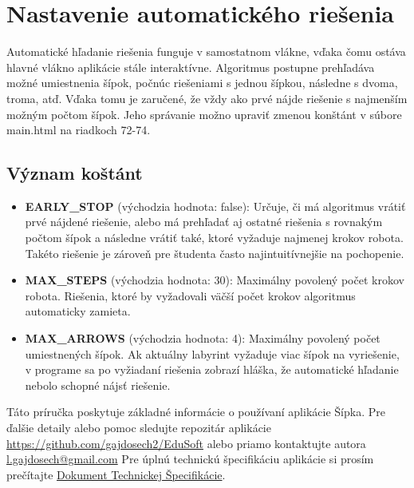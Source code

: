 \documentclass{article}
\begin{document}
\section*{Nastavenie automatického riešenia}

Automatické hľadanie riešenia funguje v samostatnom vlákne, vďaka čomu ostáva hlavné vlákno aplikácie stále interaktívne. 
Algoritmus postupne prehľadáva možné umiestnenia šípok, počnúc riešeniami s jednou šípkou, následne s dvoma, troma, atď. 
Vďaka tomu je zaručené, že vždy ako prvé nájde riešenie s najmenším možným počtom šípok. Jeho správanie možno upraviť zmenou
konštánt v súbore main.html na riadkoch 72-74.

\subsection*{Význam koštánt}
\begin{itemize}
    \item \textbf{EARLY\_STOP} (východzia hodnota: false): Určuje, či má algoritmus vrátiť prvé nájdené riešenie, 
    alebo má prehľadať aj ostatné riešenia s rovnakým počtom šípok a následne vrátiť také, ktoré vyžaduje najmenej krokov robota. 
    Takéto riešenie je zároveň pre študenta často najintuitívnejšie na pochopenie. 
    \item \textbf{MAX\_STEPS} (východzia hodnota: 30): Maximálny povolený počet krokov robota. 
    Riešenia, ktoré by vyžadovali väčší počet krokov algoritmus automaticky zamieta.
    \item \textbf{MAX\_ARROWS} (východzia hodnota: 4): Maximálny povolený počet umiestnených šípok. 
    Ak aktuálny labyrint vyžaduje viac šípok na vyriešenie,
    v programe sa po vyžiadaní riešenia zobrazí hláška, že automatické hľadanie nebolo schopné nájsť riešenie. 
\end{itemize}

Táto príručka poskytuje základné informácie o používaní aplikácie Šípka. Pre ďalšie detaily alebo pomoc sledujte repozitár aplikácie \url{https://github.com/gajdosech2/EduSoft} alebo priamo kontaktujte autora 
\href{mailto:l.gajdosech@gmail.com}{l.gajdosech@gmail.com} 
Pre úplnú technickú špecifikáciu aplikácie si prosím prečítajte \href{https://docs.google.com/document/d/1iO6MmWv0fqi1tS6VNDiRenPgHrlYh8M751RDV6SoXGI/edit?usp=sharing}{Dokument Technickej Špecifikácie}.
\end{document}

